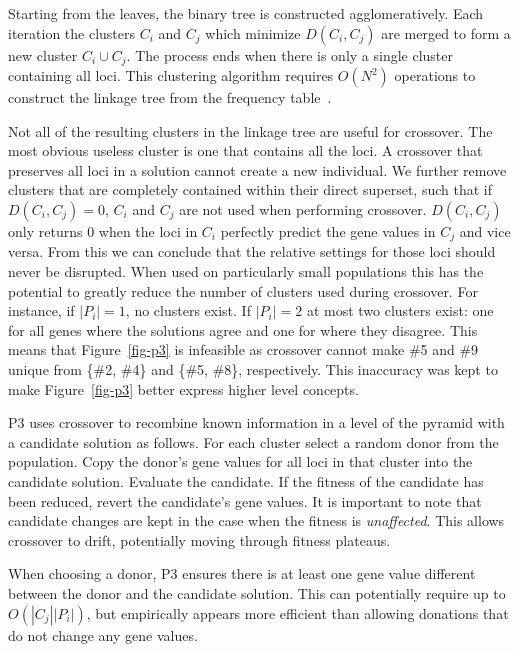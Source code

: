 \documentclass{sig-alternate}
\begin{document}
Starting from the leaves, the binary tree is constructed agglomeratively. Each
iteration the clusters $C_i$ and $C_j$ which minimize $D(C_i, C_j)$ are
merged to form a new cluster $C_i \cup C_j$.
The process ends when there is only a single cluster
containing all loci.  This clustering algorithm
requires $O(N^2)$ operations to construct the linkage tree
from the frequency table~\cite{gronau:2007:upgma}.

Not all of  the resulting clusters in the linkage  tree are useful for
crossover.  The most obvious useless  cluster is one that contains all
the loci.   A crossover that preserves  all loci in  a solution cannot
create  a  new  individual.   We  further  remove  clusters  that  are
completely  contained   within their direct superset,   such  that  if
$D(C_i,C_j) = 0$, $C_i$  and  $C_j$ are  not used  when  performing
crossover.   $D(C_i,C_j)$ only  returns  $0$ when  the  loci in  $C_i$
perfectly predict the gene values in $C_j$ and vice versa. From this we can
conclude  that  the relative settings  for  those  loci  should  never  be
disrupted.  When  used on particularly small populations  this has the
potential  to  greatly  reduce  the  number of  clusters  used  during
crossover.  For  instance, if  $|P_i| = 1$,  no clusters exist. If
$|P_i| =  2$ at most two clusters  exist: one for all  genes where the
solutions agree and one for where they disagree.
This means that Figure~\ref{fig-p3} is infeasible as crossover
cannot make \#5 and \#9 unique from \{\#2, \#4\} and \{\#5, \#8\}, respectively.
This inaccuracy was kept to make Figure~\ref{fig-p3} better express
higher level concepts.

P3 uses crossover to recombine known information in a level of the
pyramid with a candidate solution as follows.  For
each cluster select a random donor from the population.  Copy the
donor's gene values for all loci in that cluster into the candidate
solution.  Evaluate the candidate.  If the fitness of the candidate
has been reduced, revert the candidate's gene values.  It is important
to note that candidate changes are kept in the case when the fitness
is \emph{unaffected}.  This allows crossover to drift, potentially
moving through fitness plateaus.

When choosing a donor, P3 ensures there is at least one gene value
different between the donor and the candidate solution.  This can
potentially require up to $O(|C_j||P_i|)$, but empirically appears
more efficient than allowing donations that do not change any gene
values.
\end{document}
